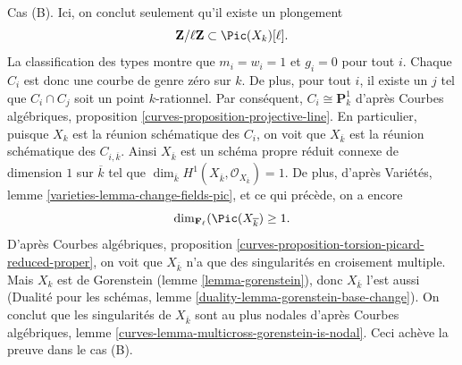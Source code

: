 \medskip\noindent
Cas (B). Ici, on conclut seulement qu'il existe un plongement
$$
\mathbf{Z}/\ell \mathbf{Z} \subset \Pic(X_k)[\ell].
$$
La classification des types montre que $m_i=w_i=1$ et $g_i=0$ pour tout
$i$. Chaque $C_i$ est donc une courbe de genre zéro sur $k$. De plus, pour
tout $i$, il existe un $j$ tel que $C_i\cap C_j$ soit un point
$k$-rationnel. Par conséquent, $C_i\cong\mathbf{P}^1_k$ d'après Courbes
algébriques, proposition \ref{curves-proposition-projective-line}.
En particulier, puisque $X_k$ est la réunion schématique des $C_i$, on voit
que $X_{\overline{k}}$ est la réunion schématique des
$C_{i,\overline{k}}$. Ainsi $X_{\overline{k}}$ est un schéma propre réduit
connexe de dimension $1$ sur $\overline{k}$ tel que
$\dim_{\overline{k}}H^1(X_{\overline{k}},
\mathcal{O}_{X_{\overline{k}}})=1$. De plus, d'après Variétés, lemme
\ref{varieties-lemma-change-fields-pic}, et ce qui précède, on a encore
$$
\dim_{\mathbf{F}_\ell}(\Pic(X_{\overline{k}}) \geq 1.
$$
D'après Courbes algébriques, proposition
\ref{curves-proposition-torsion-picard-reduced-proper}, on voit que
$X_{\overline{k}}$ n'a que des singularités en croisement multiple.
Mais $X_k$ est de Gorenstein (lemme \ref{lemma-gorenstein}), donc
$X_{\overline{k}}$ l'est aussi (Dualité pour les schémas, lemme
\ref{duality-lemma-gorenstein-base-change}). On conclut que les singularités
de $X_{\overline{k}}$ sont au plus nodales d'après Courbes algébriques,
lemme \ref{curves-lemma-multicross-gorenstein-is-nodal}. Ceci achève la
preuve dans le cas (B).


